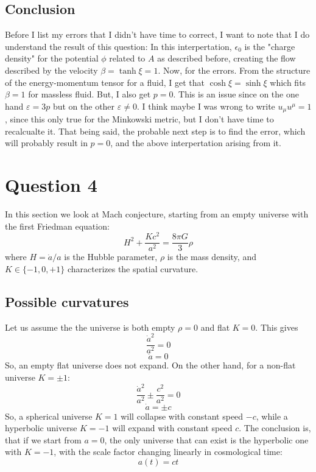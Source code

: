 \documentclass{article}
\begin{document}
\subsection{Conclusion}
Before I list my errors that I didn't have time to correct, I want to note that I do understand the result of this question:  In this interpertation, $\epsilon_0$ is the "charge density" for the potential $\phi$ related to $A$ as described before, creating the flow described by the velocity $\beta = \tanh \xi = 1$.
\newline
Now, for the errors. From the structure of the energy-momentum tensor for a fluid, I get that $\cosh \xi = \sinh \xi$ which fits $\beta = 1$ for massless fluid. But, I also get $p = 0$. This is an issue since on the one hand $\varepsilon = 3p$ but on the other $\varepsilon \ne 0$.
\newline
I think maybe I was wrong to write $u_\mu u^\mu = 1$, since this only true for the Minkowski metric, but I don't have time to recalcualte it.
\newline
That being said, the probable next step is to find the error, which will probably result in $p = 0$, and the above interpertation arising from it.

\newpage
\section{Question 4}
In this section we look at Mach conjecture, starting from an empty universe with the first Friedman equation:
\begin{equation}
\label{eq:friedmann-1}
    H^2 + \frac{Kc^2}{a^2} = \frac{8\pi G}{3}\rho
\end{equation}
where $H = \dot{a}/a$ is the Hubble parameter, $\rho$ is the mass density, and $K \in \{-1, 0, +1\}$ characterizes the spatial curvature.

\subsection{Possible curvatures}
Let us assume the the universe is both empty $\rho = 0$ and flat $K = 0$. This gives
\begin{equation}
    \frac{\dot{a}^2}{a^2} = 0
\end{equation}
\begin{equation}
    \dot{a} = 0
\end{equation}
So, an empty flat universe does not expand. On the other hand, for a non-flat universe $K = \pm 1$:
\begin{equation}
    \frac{\dot{a}^2}{a^2} \pm \frac{c^2}{a^2} = 0
\end{equation}
\begin{equation}
    \dot{a} = \pm c
\end{equation}
So, a spherical universe $K = 1$ will collapse with constant speed $-c$, while a hyperbolic universe $K = -1$ will expand with constant speed $c$. The conclusion is, that if we start from $a = 0$, the only universe that can exist is the hyperbolic one with $K = -1$, with the scale factor changing linearly in cosmological time:
\begin{equation}
    a(t) = ct
\end{equation}
\end{document}
